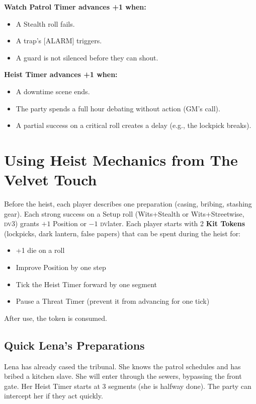 \documentclass[10pt,twoside]{book}
\newcommand{\tag}[1]{\textsc{[#1]}}
\newcommand{\dv}{\textsc{dv}}
\begin{document}
\begin{timersidebar}
\textbf{Watch Patrol Timer advances +1 when:}
\begin{itemize}
\item A Stealth roll fails.
\item A trap's \tag{ALARM} triggers.
\item A guard is not silenced before they can shout.
\end{itemize}
\textbf{Heist Timer advances +1 when:}
\begin{itemize}
\item A downtime scene ends.
\item The party spends a full hour debating without action (GM's call).
\item A partial success on a critical roll creates a delay (e.g., the lockpick breaks).
\end{itemize}
\end{timersidebar}

\section{Using Heist Mechanics from The Velvet Touch}

Before the heist, each player describes one preparation (casing, bribing, stashing gear). Each strong success on a Setup roll (Wits+Stealth or Wits+Streetwise, \dv 3) grants \(+1\) Position or \(-1\) \dv later. Each player starts with 2 \textbf{Kit Tokens} (lockpicks, dark lantern, false papers) that can be spent during the heist for:

\begin{itemize}
\item +1 die on a roll
\item Improve Position by one step
\item Tick the Heist Timer forward by one segment
\item Pause a Threat Timer (prevent it from advancing for one tick)
\end{itemize}

After use, the token is consumed.

\subsection{Quick Lena's Preparations}

Lena has already cased the tribunal. She knows the patrol schedules and has bribed a kitchen slave. She will enter through the sewers, bypassing the front gate. Her Heist Timer starts at 3 segments (she is halfway done). The party can intercept her if they act quickly.
\end{document}
